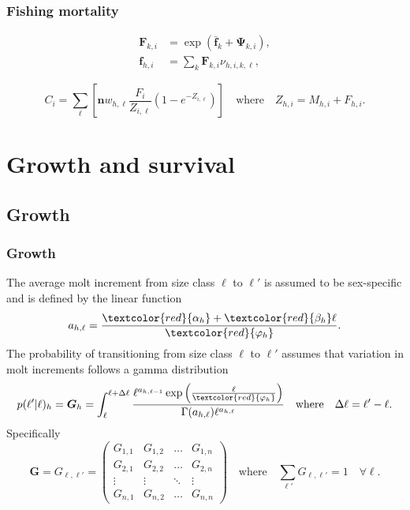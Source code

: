 \documentclass{beamer}
\begin{document}

\begin{frame}
\frametitle{Fishing mortality}
\begin{align*}
  \boldsymbol{F}_{k,i} &= \exp \left( \bar{\boldsymbol{f}}_k +
    \boldsymbol\Psi_{k,i} \right),\\
  \boldsymbol{f}_{h,i} &= \sum_k \boldsymbol{F}_{k,i} \nu_{h,i,k,\ell},
\end{align*}

\begin{equation*}
  C_{i} = \sum_{\ell} \left[ \boldsymbol{n} w_{h,\ell} \frac{F_{i}}{Z_{i,\ell}} 
    \left( 1 - e^{-Z_{i,\ell}} \right) \right] \quad \text{where} \quad Z_{h,i}
  = M_{h,i} + F_{h,i}.
\end{equation*}

\end{frame}


\section{Growth and survival}


\subsection{Growth}
\begin{frame}
\frametitle{Growth}
The average molt increment from size class $\ell$ to $\ell'$ is assumed to be
sex-specific and is defined by the linear function
\begin{equation*}
  a_{h,\ell} = \frac{\textcolor{red}{\alpha_h} + \textcolor{red}{\beta_h}
    \ell}{\textcolor{red}{\varphi_h}}.
\end{equation*}
The probability of transitioning from size class $\ell$ to $\ell'$ assumes that
variation in molt increments follows a gamma distribution
\begin{equation*}
  p (\ell'|\ell)_h = \boldsymbol{G}_h = \int^{\ell + \Delta \ell}_\ell \frac{\ell^{a_{h,\ell-1}} \exp
    \left(\frac{\ell}{\textcolor{red}{\varphi_h}} \right)}{\Gamma (a_{h,\ell}) \ell^{a_{h,\ell}}}
  \quad \text{where} \quad \Delta \ell = \ell' - \ell.
\end{equation*}
Specifically
\begin{equation*}
  \boldsymbol{G} = G_{\ell,\ell'} = \left( \begin{array}{cccc}
      G_{1,1} & G_{1,2} & \hdots & G_{1,n} \\
      G_{2,1} & G_{2,2} & \hdots & G_{2,n} \\
      \vdots & \vdots & \ddots & \vdots \\
      G_{n,1} & G_{n,2} & \hdots & G_{n,n} \end{array} \right)
  \quad \text{where} \quad \sum_{\ell'} G_{\ell,\ell'} = 1 \quad \forall \ell.
\end{equation*}
\end{frame}
\end{document}
